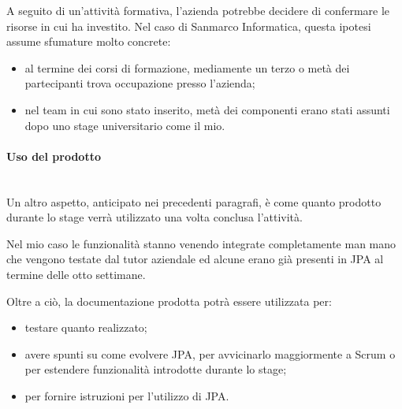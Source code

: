 A seguito di un'attività formativa, l'azienda potrebbe decidere di confermare
le risorse in cui ha investito. Nel caso di Sanmarco Informatica, questa
ipotesi assume sfumature molto concrete:

\begin{itemize}
\item al termine dei corsi di formazione, mediamente un terzo o metà dei
  partecipanti trova occupazione presso l'azienda;
\item nel team in cui sono stato inserito, metà dei componenti erano stati
assunti dopo uno stage universitario come il mio.
\end{itemize}

\paragraph{Uso del prodotto} \mbox{} \\

Un altro aspetto, anticipato nei precedenti paragrafi, è come quanto prodotto
durante lo stage verrà utilizzato una volta conclusa l'attività.

Nel mio caso le funzionalità stanno venendo integrate completamente man mano
che vengono testate dal tutor aziendale ed alcune erano già presenti in JPA al
termine delle otto settimane.

Oltre a ciò, la documentazione prodotta potrà essere utilizzata per:

\begin{itemize}
\item testare quanto realizzato;
\item avere spunti su come evolvere JPA, per avvicinarlo maggiormente a Scrum
  o per estendere funzionalità introdotte durante lo stage;
\item per fornire istruzioni per l'utilizzo di JPA.
\end{itemize}
